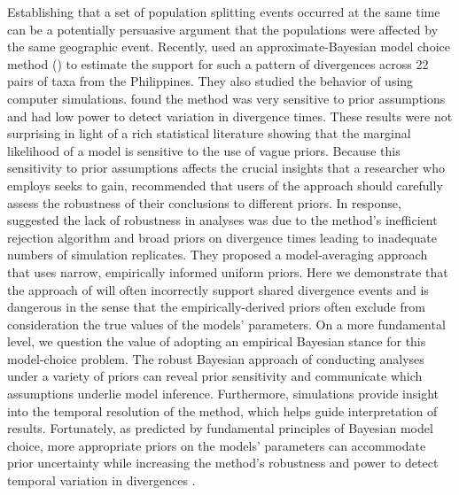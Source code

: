 Establishing that a set of population splitting events occurred at the same
time can be a potentially persuasive argument that the populations were
affected by the same geographic event.
Recently, \citet{Oaks2012} used an approximate-Bayesian model choice method
(\msb) to estimate the support for such a pattern of divergences across 22
pairs of taxa from the Philippines.
They also studied the behavior of \msb using computer simulations.
\citet{Oaks2012} found the method was very sensitive to prior assumptions and
had low power to detect variation in divergence times.
These results were not surprising in light of a rich statistical literature
showing that the marginal likelihood of a model is sensitive to the
use of vague priors.
Because this sensitivity to prior assumptions affects the crucial insights that
a researcher who employs \msb seeks to gain, \citet{Oaks2012} recommended that
users of the approach should carefully assess the robustness of their
conclusions to different priors.
In response, \citet{Hickerson2013} suggested the lack of robustness in \msb
analyses was due to the method's inefficient rejection algorithm and broad
priors on divergence times leading to inadequate numbers of simulation
replicates.
They proposed a model-averaging approach that uses narrow, empirically
informed uniform priors.
Here we demonstrate that the approach of \citet{Hickerson2013} will often
incorrectly support shared divergence events and is dangerous in the sense that
the empirically-derived priors often exclude from consideration the true values
of the models' parameters.
On a more fundamental level, we question the value of adopting an empirical
Bayesian stance for this model-choice problem.
The robust Bayesian approach of conducting analyses under a variety of priors
can reveal prior sensitivity and communicate which assumptions underlie model
inference.
Furthermore, simulations provide insight into the temporal resolution of the
method, which helps guide interpretation of results.
Fortunately, as predicted by fundamental principles of Bayesian model choice,
more appropriate priors on the models' parameters can accommodate prior
uncertainty while increasing the method's robustness and power to detect
temporal variation in divergences
\citep{Oaks2014dpp}.
